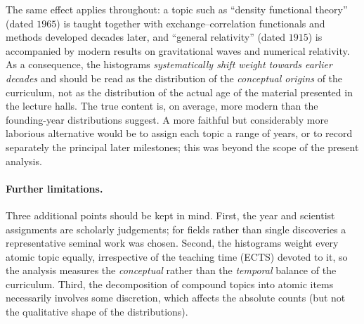 \documentclass[11pt,a4paper]{article}
\begin{document}
The same effect applies throughout: a topic such as ``density functional
theory'' (dated $1965$) is taught together with exchange--correlation functionals
and methods developed decades later, and ``general relativity'' (dated $1915$)
is accompanied by modern results on gravitational waves and numerical relativity.
As a consequence, the histograms \emph{systematically shift weight towards
earlier decades} and should be read as the distribution of the \emph{conceptual
origins} of the curriculum, not as the distribution of the actual age of the
material presented in the lecture halls. The true content is, on average,
more modern than the founding-year distributions suggest. A more faithful but
considerably more laborious alternative would be to assign each topic a range of
years, or to record separately the principal later milestones; this was beyond
the scope of the present analysis.

\paragraph{Further limitations.}
Three additional points should be kept in mind. First, the year and scientist
assignments are scholarly judgements; for fields rather than single discoveries
a representative seminal work was chosen. Second, the histograms weight every
atomic topic equally, irrespective of the teaching time (ECTS) devoted to it, so
the analysis measures the \emph{conceptual} rather than the \emph{temporal}
balance of the curriculum. Third, the decomposition of compound topics into
atomic items necessarily involves some discretion, which affects the absolute
counts (but not the qualitative shape of the distributions).
\end{document}
